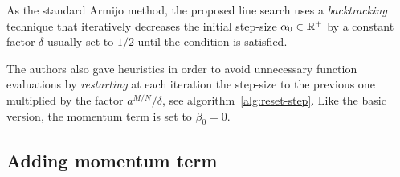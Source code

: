 
As the standard Armijo method, the proposed line search uses a \emph{backtracking} technique that iteratively decreases the initial step-size $\alpha_0\in\mathbb{R}^+$ by a constant factor $\delta$ usually set to $1/2$ until the condition is satisfied.

The authors also gave heuristics in order to avoid unnecessary function evaluations by \emph{restarting} at each iteration the step-size to the previous one multiplied by the factor $a^{M/N}/\delta$, see algorithm~\vref{alg:reset-step}. Like the basic version, the momentum term is set to $\beta_0=0$.%

\subsection{Adding momentum term}\label{subsc:sgdm}

